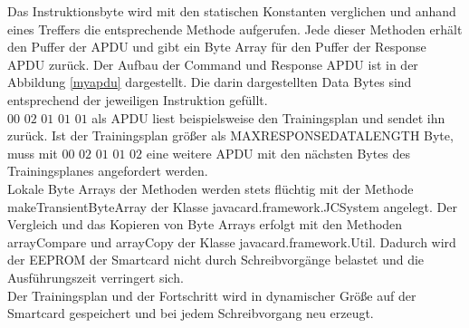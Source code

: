 
Das Instruktionsbyte wird mit den statischen Konstanten verglichen und anhand eines Treffers die entsprechende Methode aufgerufen. Jede dieser Methoden erhält den Puffer der APDU und gibt ein Byte Array für den Puffer der Response APDU zurück.
Der Aufbau der Command und Response APDU ist in der Abbildung \ref{myapdu} dargestellt.
Die darin dargestellten Data Bytes sind entsprechend der jeweiligen Instruktion gefüllt.\\
$00$ $02$ $01$ $01$ $01$ als APDU liest beispielsweise den Trainingsplan und sendet ihn zurück. Ist der Trainingsplan größer als MAXRESPONSEDATALENGTH Byte, muss mit $00$ $02$ $01$ $01$ $02$ eine weitere APDU mit den nächsten Bytes des Trainingsplanes angefordert werden.
\\

Lokale Byte Arrays der Methoden werden stets flüchtig mit der Methode makeTransientByteArray der Klasse javacard.framework.JCSystem angelegt.
Der Vergleich und das Kopieren von Byte Arrays erfolgt mit den Methoden arrayCompare und arrayCopy der Klasse javacard.framework.Util.
Dadurch wird der EEPROM der Smartcard nicht durch Schreibvorgänge belastet und die Ausführungszeit verringert sich.
\\

Der Trainingsplan und der Fortschritt wird in dynamischer Größe auf der Smartcard gespeichert und bei jedem Schreibvorgang neu erzeugt.